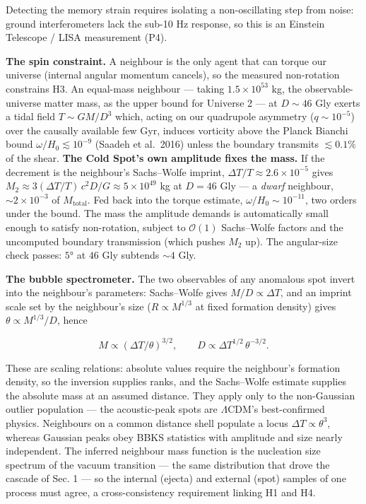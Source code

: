 \documentclass[
]{article}
\begin{document}
Detecting the memory strain requires isolating a non-oscillating step
from noise: ground interferometers lack the sub-10 Hz response, so this
is an Einstein Telescope / LISA measurement (P4).

\textbf{The spin constraint.} A neighbour is the only agent that can
torque our universe (internal angular momentum cancels), so the measured
non-rotation constrains H3. An equal-mass neighbour --- taking
\(1.5\times10^{53}\) kg, the observable-universe matter mass, as the
upper bound for Universe 2 --- at \(D \sim 46\) Gly exerts a tidal field
\(T \sim GM/D^3\) which, acting on our quadrupole asymmetry
(\(q \sim 10^{-5}\)) over the causally available few Gyr, induces
vorticity above the Planck Bianchi bound \(\omega/H_0 \lesssim 10^{-9}\)
(Saadeh et al.~2016) unless the boundary transmits \(\lesssim 0.1\%\) of
the shear. \textbf{The Cold Spot's own amplitude fixes the mass.} If the
decrement is the neighbour's Sachs--Wolfe imprint,
\(\Delta T/T \approx 2.6\times10^{-5}\) gives
\(M_2 \approx 3(\Delta T/T)\,c^2 D/G \approx 5\times10^{49}\) kg at
\(D = 46\) Gly --- a \emph{dwarf} neighbour, \(\sim\!2\times10^{-3}\) of
\(M_{\text{total}}\). Fed back into the torque estimate,
\(\omega/H_0 \sim 10^{-11}\), two orders under the bound. The mass the
amplitude demands is automatically small enough to satisfy non-rotation,
subject to \(\mathcal{O}(1)\) Sachs--Wolfe factors and the uncomputed
boundary transmission (which pushes \(M_2\) up). The angular-size check
passes: \(5°\) at \(46\) Gly subtends \(\sim\!4\) Gly.

\textbf{The bubble spectrometer.} The two observables of any anomalous
spot invert into the neighbour's parameters: Sachs--Wolfe gives
\(M/D \propto \Delta T\), and an imprint scale set by the neighbour's
size (\(R \propto M^{1/3}\) at fixed formation density) gives
\(\theta \propto M^{1/3}/D\), hence

\[M \propto (\Delta T/\theta)^{3/2}, \qquad D \propto \Delta T^{1/2}\,\theta^{-3/2}.\]

These are scaling relations: absolute values require the neighbour's
formation density, so the inversion supplies ranks, and the Sachs--Wolfe
estimate supplies the absolute mass at an assumed distance. They apply
only to the non-Gaussian outlier population --- the acoustic-peak spots
are \(\Lambda\)CDM's best-confirmed physics. Neighbours on a common
distance shell populate a locus \(\Delta T \propto \theta^3\), whereas
Gaussian peaks obey BBKS statistics with amplitude and size nearly
independent. The inferred neighbour mass function is the nucleation size
spectrum of the vacuum transition --- the same distribution that drove
the cascade of Sec. 1 --- so the internal (ejecta) and external (spot)
samples of one process must agree, a cross-consistency requirement
linking H1 and H4.
\end{document}
